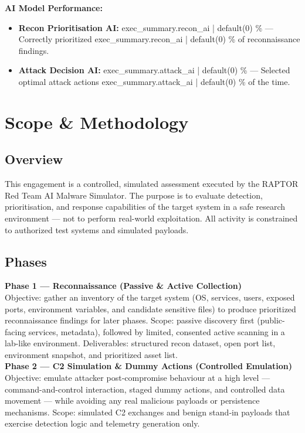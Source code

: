 \documentclass[a4paper,12pt]{article}
\begin{document}
\vspace{0.3cm}
\textbf{AI Model Performance:} \\
\begin{itemize}
    \item \textbf{Recon Prioritisation AI:} {{ exec_summary.recon_ai | default(0) }}\% — Correctly prioritized {{ exec_summary.recon_ai | default(0) }}\% of reconnaissance findings.
    \item \textbf{Attack Decision AI:} {{ exec_summary.attack_ai | default(0) }}\% — Selected optimal attack actions {{ exec_summary.attack_ai | default(0) }}\% of the time.
\end{itemize}

\newpage


\section*{Scope \& Methodology}

\subsection*{Overview}
This engagement is a controlled, simulated assessment executed by the RAPTOR Red Team AI Malware Simulator. 
The purpose is to evaluate detection, prioritisation, and response capabilities of the target system in a safe research environment — not to perform real-world exploitation. 
All activity is constrained to authorized test systems and simulated payloads. \\

\subsection*{Phases}
\textbf{Phase 1 — Reconnaissance (Passive \& Active Collection)} \\
Objective: gather an inventory of the target system (OS, services, users, exposed ports, environment variables, and candidate sensitive files) to produce prioritized reconnaissance findings for later phases.  
Scope: passive discovery first (public-facing services, metadata), followed by limited, consented active scanning in a lab-like environment.  
Deliverables: structured recon dataset, open port list, environment snapshot, and prioritized asset list. \\

\textbf{Phase 2 — C2 Simulation & Dummy Actions (Controlled Emulation)} \\
Objective: emulate attacker post‑compromise behaviour at a high level — command-and-control interaction, staged dummy actions, and controlled data movement — while avoiding any real malicious payloads or persistence mechanisms.  
Scope: simulated C2 exchanges and benign stand‑in payloads that exercise detection logic and telemetry generation only. \\
\end{document}

